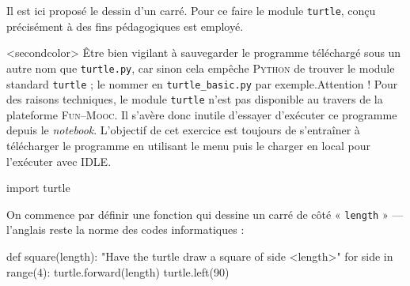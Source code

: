 \begin{exercise}[title=Dessin de carré, level=intermediate]
Il est ici proposé le dessin d'un carré. Pour ce faire le module \texttt{turtle}, conçu précisément à des fins pédagogiques est employé. 

\caution[b]<secondcolor>{%
Être bien vigilant à sauvegarder le programme téléchargé sous un autre nom que \texttt{turtle.py}, car sinon cela empêche \textsc{Python} de trouver le module standard \texttt{turtle} ; le nommer en \texttt{turtle\_basic.py} par exemple.}{Attention !}
Pour des raisons techniques, le module \texttt{turtle} n'est pas disponible au travers de la plateforme \textsc{Fun--Mooc}. Il s'avère donc inutile d'essayer d'exécuter ce programme depuis le \textit{notebook}. L'objectif de cet exercice est toujours de s'entraîner à télécharger le programme en utilisant le menu  puis le charger en local pour l'exécuter avec IDLE.


\begin{idleconsole}
\begin{pyconsole}
import turtle
\end{pyconsole}
\end{idleconsole}

On commence par définir une fonction qui dessine un carré de côté « \texttt{length} » --- l'anglais reste la norme des codes informatiques :


\begin{idleconsole}
\begin{pyconsole}
def square(length):
    "Have the turtle draw a square of side <length>"
    for side in range(4):
        turtle.forward(length)
        turtle.left(90)

\end{pyconsole}
\end{idleconsole}


\end{exercise}
